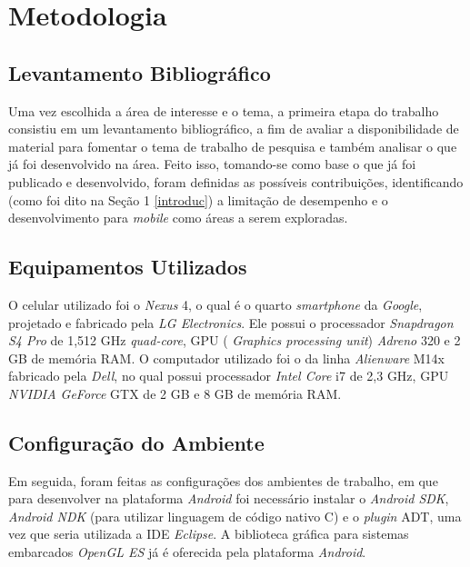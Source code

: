 \chapter[Metodologia]{Metodologia}

\section{Levantamento Bibliográfico}

Uma vez escolhida a área de interesse e o tema, a primeira etapa do trabalho consistiu em um levantamento bibliográfico, a fim de avaliar a disponibilidade de material para fomentar o tema de trabalho de pesquisa e também analisar o que já foi desenvolvido na área. Feito isso, tomando-se como base o que já foi publicado e desenvolvido, foram definidas as possíveis contribuições, identificando (como foi dito na Seção 1 \ref{introduc}) a limitação de desempenho e o desenvolvimento para \textit{mobile} como áreas a serem exploradas.  

\section{Equipamentos Utilizados}

O celular utilizado foi o \textit{Nexus} 4, o qual é o quarto  \textit{smartphone} da  \textit{Google}, projetado e fabricado pela \textit{LG Electronics}.  Ele possui o processador \textit{Snapdragon S4 Pro} de 1,512 GHz \textit{quad-core}, GPU ( \textit{Graphics processing unit}) \textit{Adreno} 320 e 2 GB de memória RAM. O computador utilizado foi o da linha \textit{Alienware} M14x fabricado pela \textit{Dell}, no qual possui processador \textit{Intel Core} i7 de 2,3 GHz, GPU \textit{NVIDIA GeForce} GTX de 2 GB e 8 GB de memória RAM. 

\section{Configuração do Ambiente}
\label{configamb}	

	Em seguida, foram feitas as configurações dos ambientes de trabalho, em que  para desenvolver na plataforma \textit{Android} foi necessário instalar o \textit{Android SDK}, \textit{Android NDK} (para utilizar linguagem de código nativo C) e o \textit{plugin} ADT, uma vez que seria utilizada a IDE \textit{Eclipse}. A biblioteca gráfica para sistemas embarcados \textit{OpenGL ES} já é oferecida pela plataforma \textit{Android}. 

